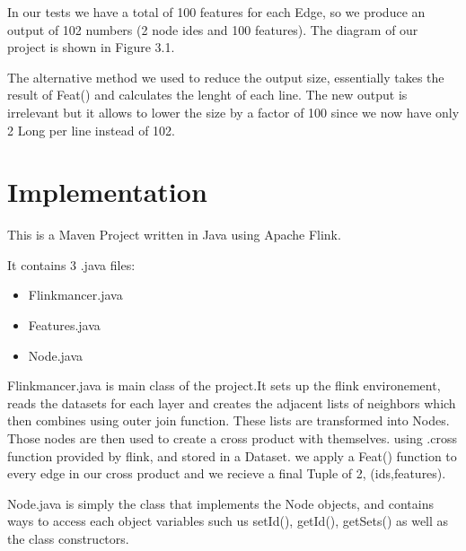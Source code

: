 In our tests we have a total of 100 features for each Edge, so we produce an output of 102 numbers (2 node ides and 100 features). The diagram of our project is shown in Figure 3.1.

The alternative method we used to reduce the output size, essentially takes the result of Feat() and calculates the lenght of each line. The new output is irrelevant but it allows to lower the size by a factor of 100 since we now have only 2 Long per line instead of 102.



\section{Implementation}

This is a Maven Project written in Java using Apache Flink. 

It contains 3 .java files:
\begin{itemize} 
\item Flinkmancer.java
\item Features.java
\item Node.java
\end{itemize}

Flinkmancer.java is main class of the project.It sets up the flink environement, reads the datasets for each layer and creates the adjacent lists of neighbors which then combines using outer join function. These lists are transformed into Nodes. Those nodes are then used to create a cross product with themselves. using .cross function provided by flink, and stored in a Dataset. we apply a Feat() function to every edge in our cross product and we recieve a final Tuple of 2, (ids,features). \newline

Node.java is simply the class that implements the Node objects, and contains ways to access each object variables such us setId(), getId(), getSets() as well as the class constructors. \newline

